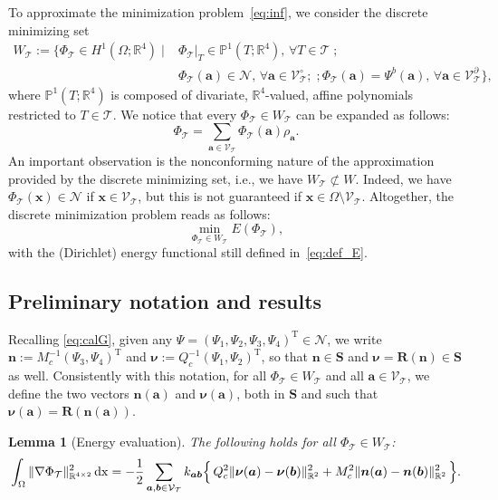 \documentclass[a4paper,11pt]{article}
\newtheorem{lemma}[theorem]{Lemma}
\theoremstyle{definition}
\theoremstyle{remark}
\numberwithin{equation}{section}
\newcommand{\dx}{\,{\rm dx}}
\newcommand{\Real}{\mathbb{R}}
\newcommand{\polP}{\mathbb{P}}
\newcommand{\ba}{{\boldsymbol a}}
\newcommand{\bb}{{\boldsymbol b}}
\newcommand{\bn}{{\boldsymbol n}}
\newcommand{\bx}{{\boldsymbol x}}
\newcommand{\bR}{{\boldsymbol R}}
\newcommand{\bS}{{\boldsymbol S}}
\newcommand{\bnu}{{\boldsymbol \nu}}
\newcommand{\calN}{\mathcal{N}}
\newcommand{\calT}{\mathcal{T}}
\newcommand{\calV}{\mathcal{V}}
\newcommand{\tr}{^{\mathrm{T}}}
\newcommand{\vertex}{\calV_\calT}
\newcommand{\vertexi}{\calV_\calT^\circ}
\newcommand{\vertexb}{\calV_\calT^\partial}
\begin{document}
To approximate the minimization problem~\eqref{eq:inf}, we consider the discrete minimizing set
\begin{align}
W_\calT := \{ \Phi_\calT \in H^1(\Omega;\Real^4) \;|\; & \Phi_{\calT}|_T \in \polP^1(T;\Real^4), \, \forall T\in\calT \;;\; \nonumber \\
& \Phi_\calT(\ba)\in \calN,\, \forall \ba\in\vertexi;\;; \Phi_\calT(\ba)=\Psi^b(\ba),\,\forall \ba\in\vertexb\},
\end{align}
where $\polP^1(T;\Real^4)$ is composed of divariate, $\Real^4$-valued, affine polynomials restricted to $T\in\calT$. 
We notice that every $\Phi_\calT \in W_\calT$ can be expanded as follows:
\begin{equation} \label{eq:expansion}
\Phi_\calT = \sum_{\ba \in\vertex} \Phi_\calT(\ba) \rho_\ba.
\end{equation}
An important observation is the nonconforming nature of the approximation provided by the discrete minimizing set, i.e., we have $W_\calT \not \subset W$. Indeed, we have $\Phi_\calT(\bx) \in \calN$ if $\bx\in\vertex$, but this is not guaranteed if $\bx\in \Omega \setminus \vertex$.
Altogether, the discrete minimization problem reads as follows:
\begin{equation} \label{eq:disc_inf}
\min_{\Phi_\calT\in W_\calT} E(\Phi_\calT),
\end{equation}
with the (Dirichlet) energy functional still defined in~\eqref{eq:def_E}.

\subsection{Preliminary notation and results}

Recalling \eqref{eq:calG}, given any $\Psi=(\Psi_1,\Psi_2,\Psi_3,\Psi_4)\tr \in \calN$,
we write $\bn:=M_c^{-1}(\Psi_3,\Psi_4)\tr$ and $\bnu:=Q_c^{-1}(\Psi_1,\Psi_2)\tr$,
so that $\bn \in \bS$ and $\bnu=\bR(\bn)\in \bS$ as well. Consistently with this notation,
for all $\Phi_\calT \in W_\calT$ and all $\ba\in\vertex$, we define the two vectors
$\bn(\ba)$ and $\bnu(\ba)$, both in $\bS$ and such that $\bnu(\ba)=\bR(\bn(\ba))$.

\begin{lemma}[Energy evaluation] \label{lem:engy_eval}
The following holds for all $\Phi_\calT \in W_\calT$:
\begin{equation} \label{eq:engy_eval}
\int_\Omega \|\nabla \Phi_\calT\|_{\Real^{4\times2}}^2 \dx = - \frac12
\sum_{\ba,\bb\in\vertex} k_{\ba\bb}\Big\{ \, Q_c^2\|\bnu(\ba)-\bnu(\bb)\|_{\Real^2}^2
+ M_c^2\|\bn(\ba)-\bn(\bb)\|_{\Real^2}^2 \, \Big\}.
\end{equation}
\end{lemma}
\end{document}
